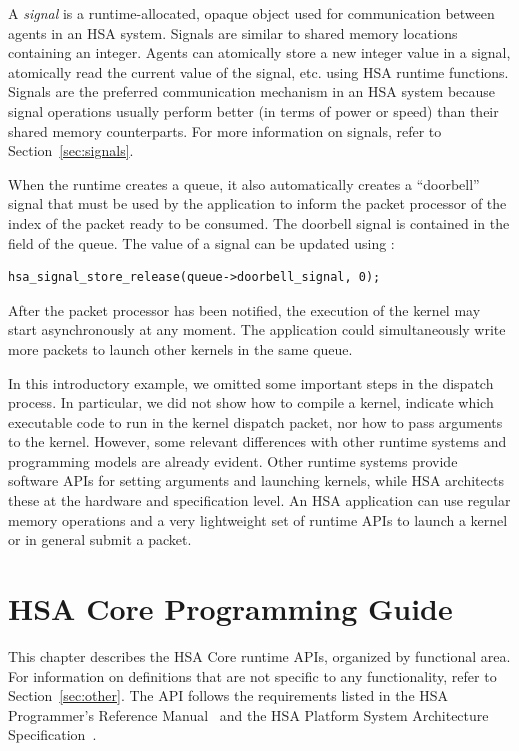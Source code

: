 \documentclass[final,oneside]{book}
\begin{document}
A \emph{signal} is a runtime-allocated, opaque object used for communication
between agents in an HSA system. Signals are similar to shared memory
locations containing an integer. Agents can atomically store a new integer
value in a signal, atomically read the current value of the signal, etc. using
HSA runtime functions.  Signals are the preferred communication mechanism in an
HSA system because signal operations usually perform better (in terms of power
or speed) than their shared memory counterparts. For more information on
signals, refer to Section~\ref{sec:signals}.

When the runtime creates a queue, it also automatically creates a ``doorbell''
signal that must be used by the application to inform the packet processor of
the index of the packet ready to be consumed. The doorbell signal is contained
in the  field of the queue. The value of a
signal can be updated using :

\begin{lstlisting}
hsa_signal_store_release(queue->doorbell_signal, 0);
\end{lstlisting}

After the packet processor has been notified, the execution of the kernel may
start asynchronously at any moment. The application could simultaneously write
more packets to launch other kernels in the same queue.

In this introductory example, we omitted some important steps in the dispatch
process. In particular, we did not show how to compile a kernel, indicate which
executable code to run in the kernel dispatch packet, nor how to pass arguments
to the kernel. However, some relevant differences with other runtime systems and
programming models are already evident.  Other runtime systems provide software
APIs for setting arguments and launching kernels, while HSA architects these at
the hardware and specification level. An HSA application can use regular memory
operations and a very lightweight set of runtime APIs to launch a kernel or in
general submit a packet.


\chapter{HSA Core Programming Guide} \label{coreapi}

This chapter describes the HSA Core runtime APIs, organized by functional
area. For information on definitions that are not specific to any functionality,
refer to Section~\ref{sec:other}. The API follows the requirements listed in the
HSA Programmer's Reference Manual~\cite{prm} and the HSA Platform System
Architecture Specification~\cite{sar}.
\end{document}
